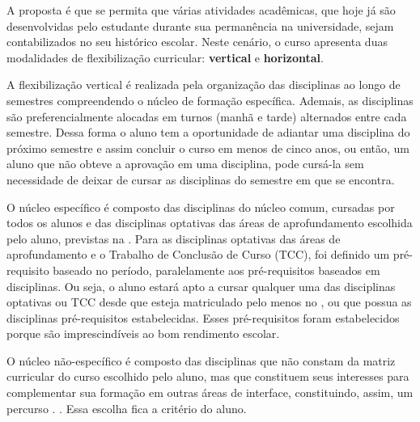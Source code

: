 A proposta é que se permita que várias atividades acadêmicas, que hoje já são desenvolvidas pelo estudante durante sua permanência na universidade, sejam contabilizados no seu histórico escolar. Neste cenário, o curso apresenta duas modalidades de flexibilização curricular: \textbf{vertical} e \textbf{horizontal}. 

A flexibilização vertical é realizada pela organização das disciplinas ao longo de semestres compreendendo o núcleo de formação específica. Ademais, as disciplinas são preferencialmente alocadas em turnos (manhã e tarde) alternados entre cada semestre. Dessa forma o aluno tem a oportunidade de adiantar uma disciplina do próximo semestre e assim concluir o curso em menos de cinco anos, ou então, um aluno que não obteve a aprovação em uma disciplina, pode cursá-la sem necessidade de deixar de cursar as disciplinas do semestre em que se encontra.

O núcleo específico é composto das disciplinas do núcleo comum, cursadas por todos os alunos e das disciplinas optativas das áreas de aprofundamento escolhida pelo aluno, previstas na . Para as disciplinas optativas das áreas de aprofundamento e o Trabalho de Conclusão de Curso (TCC), foi definido um pré-requisito baseado no período, paralelamente aos pré-requisitos baseados em disciplinas. Ou seja, o aluno estará apto a cursar qualquer uma das disciplinas optativas ou TCC desde que esteja matriculado pelo menos no , ou que possua as disciplinas pré-requisitos estabelecidas. Esses pré-requisitos foram estabelecidos porque são imprescindíveis ao bom rendimento escolar.


O núcleo não-específico é composto das disciplinas que não constam da matriz curricular do curso escolhido pelo aluno, mas que constituem seus interesses para complementar sua formação em outras áreas de interface, constituindo, assim, um percurso . . Essa escolha fica a critério do aluno. 

